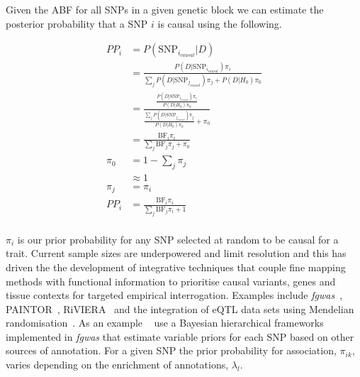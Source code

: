 \documentclass[a4paper,11pt]{report}
\begin{document}
Given the ABF for all SNPs in a given genetic block we can estimate the posterior probability that a SNP $i$  is causal using the following. 

\begin{equation}
\begin{split}
	PP_{i}& = P(\text{SNP}_{i_{causal}} | D)\\
	& = \frac{P(D | \text{SNP}_{i_{causal}})\pi_{i}}{\sum_{j}P(D | \text{SNP}_{j_{causal}})\pi_{j} + P(D | H_{0})\pi_0}\\
	& = \frac{
				\frac{
					P(D | \text{SNP}_{i_{causal}})\pi_{i}
				}
				{
					P(D|H_{0})\pi_0
				}
		}
		{
				\frac{
					\sum_{j}P(D | \text{SNP}_{j_{causal}})\pi_{j}
				}
				{
					P(D|H_{0})\pi_{0}
				}  + \pi_0
		}	\\
	& = \frac{
		\text{BF}_{i}\pi_{i}
	}
	{
	\sum_{j}\text{BF}_{j}\pi_{j} + \pi_{0}
	} \\	
	\pi_{0}& = 1-\sum_{j}\pi_{j} \\
	&\approx 1\\
	\pi_{j}& = \pi_{i}\\
	PP_{i}& = \frac{
		\text{BF}_{i}\pi_{i}
	}
	{
	\sum_{j}\text{BF}_{j}\pi_{i} + 1
	} \\
\end{split}
\end{equation}

%
%	

$\pi_{i}$ is our prior probability for any SNP selected at random to be causal for a trait. Current sample sizes are underpowered and limit resolution and this has driven the the development of integrative techniques that couple fine mapping methods with functional information to prioritise causal variants, genes and tissue contexts for targeted empirical interrogation. Examples include \textit{fgwas}~\citep{Pickrell2014-xs}, PAINTOR~\citep{KichaevYangLindstromEtAl2014}, RiVIERA~\citep{LiKellis2016}   and the integration of eQTL data sets using Mendelian randomisation~\citep{ZhuZhangHuEtAl2016}. As an example ~\citet{Pickrell2014-xs} use a Bayesian hierarchical frameworks implemented in \textit{fgwas} that estimate variable priors for each SNP based on other sources of annotation. For a given SNP the prior probability for association, $\pi_{ik}$, varies depending on the enrichment of annotations, $\lambda_{l}$. 
\end{document}
